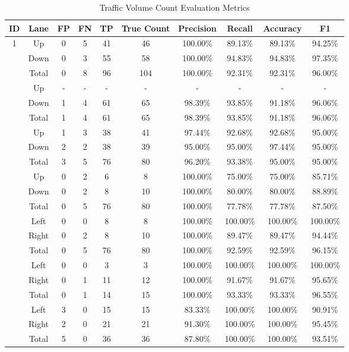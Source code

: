 \begin{table}[H]
    \centering
    \begin{tabular}{|cccccccccc|} 
    \hline
    \textbf{ID} & \textbf{Lane} & \textbf{FP} & \textbf{FN}& \textbf{TP}& \textbf{True Count}&\textbf{Precision}& \textbf{Recall}& \textbf{Accuracy} & \textbf{F1}\\
    \hline
    \multirow{3}{1em}{1}  
    &Up&0&5&41&46&100.00\%&89.13\%&89.13\%&94.25\%\\\cline{2-10}
    &Down&0&3&55&58&100.00\%&94.83\%&94.83\%&97.35\%\\\cline{2-10}
    &Total&0&8&96&104&100.00\%&92.31\%&92.31\%&96.00\%\\\Xhline{1pt}

    \multirow{3}{1em}{2}
    &Up&-&-&-&-&-&-&-&-\\\cline{2-10}
    &Down&1&4&61&65&98.39\%&93.85\%&91.18\%&96.06\%\\\cline{2-10}
    &Total&1&4&61&65&98.39\%&93.85\%&91.18\%&96.06\%\\\Xhline{1pt}

    \multirow{3}{1em}{3}
    &Up&1&3&38&41&97.44\%&92.68\%&92.68\%&95.00\%\\\cline{2-10}
    &Down&2&2&38&39&95.00\%&95.00\%&97.44\%&95.00\%\\\cline{2-10}
    &Total&3&5&76&80&96.20\%&93.38\%&95.00\%&95.00\%\\\Xhline{1pt}

    \multirow{3}{1em}{4}
    &Up&0&2&6&8&100.00\%&75.00\%&75.00\%&85.71\%\\\cline{2-10}
    &Down&0&2&8&10&100.00\%&80.00\%&80.00\%&88.89\%\\\cline{2-10}
    &Total&0&5&76&80&100.00\%&77.78\%&77.78\%&87.50\%\\\Xhline{1pt}

    \multirow{3}{1em}{5}
    &Left&0&0&8&8&100.00\%&100.00\%&100.00\%&100.00\%\\\cline{2-10}
    &Right&0&2&8&10&100.00\%&89.47\%&89.47\%&94.44\%\\\cline{2-10}
    &Total&0&5&76&80&100.00\%&92.59\%&92.59\%&96.15\%\\\Xhline{1pt}

    \multirow{3}{1em}{6}
    &Left&0&0&3&3&100.00\%&100.00\%&100.00\%&100.00\%\\\cline{2-10}
    &Right&0&1&11&12&100.00\%&91.67\%&91.67\%&95.65\%\\\cline{2-10}
    &Total&0&1&14&15&100.00\%&93.33\%&93.33\%&96.55\%\\\Xhline{1pt}

    \multirow{3}{1em}{7}
    &Left&3&0&15&15&83.33\%&100.00\%&100.00\%&90.91\%\\\cline{2-10}
    &Right&2&0&21&21&91.30\%&100.00\%&100.00\%&95.45\%\\\cline{2-10}
    &Total&5&0&36&36&87.80\%&100.00\%&100.00\%&93.51\%\\\hline

    
\end{tabular}
\caption{Traffic Volume Count Evaluation Metrics}
\label{table:volume_table}
\end{table}
\raggedbottom

